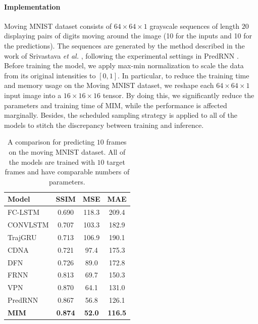 \documentclass[10pt,twocolumn,letterpaper]{article}
\begin{document}
\paragraph{Implementation} Moving MNIST dataset consists of $64 \times 64 \times 1$ grayscale sequences of length $20$ displaying pairs of digits moving around the image (10 for the inputs and 10 for the predictions). The sequences are generated by the method described in the work of Srivastava \textit{et al.} \citep{srivastava2015unsupervised}, following the experimental settings in PredRNN \citep{wang2017predrnn}. Before training the model, we apply max-min normalization to scale the data from its original intensities to $[0, 1]$. In particular, to reduce the training time and memory usage on the Moving MNIST dataset, we reshape each $64 \times 64 \times 1$ input image into a $16 \times 16 \times 16$ tensor. By doing this, we significantly reduce the parameters and training time of MIM, while the performance is affected marginally. Besides, the scheduled sampling strategy \citep{bengio2015scheduled} is applied to all of the models to stitch the discrepancy between training and inference.

\begin{table}[h]
  \caption{A comparison for predicting $10$ frames on the moving MNIST dataset. All of the models are trained with $10$ target frames and have comparable numbers of parameters.}
  \label{tab:mnist_10_result}
  \vskip 0.15in
  \centering
  \begin{small}
  \begin{sc}
  \renewcommand{\multirowsetup}{\centering}  
  \begin{tabular}{lccc}
    \toprule
    Model & SSIM & MSE & MAE\\
    \midrule
    FC-LSTM & 0.690 & 118.3 & 209.4 \\ 
    CONVLSTM & 0.707 & 103.3 & 182.9 \\ 
    TrajGRU & 0.713 & 106.9 & 190.1 \\ 
    CDNA & 0.721 & 97.4 & 175.3 \\ 
    DFN & 0.726 & 89.0 & 172.8 \\ 
    FRNN & 0.813 & 69.7 & 150.3 \\ 
    VPN & 0.870 & 64.1 & 131.0 \\
    PredRNN & 0.867 & 56.8 & 126.1 \\
    \midrule
    \textbf{MIM} & \textbf{0.874} & \textbf{52.0} & \textbf{116.5} \\
    \bottomrule
  \end{tabular}
  \end{sc}
  \end{small}
\end{table}
\end{document}
